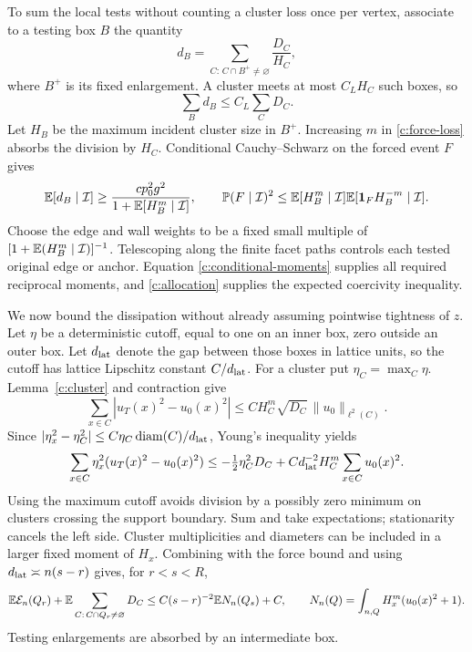 To sum the local tests without counting a cluster loss once per vertex,
associate to a testing box $B$ the quantity
\[
 d_B=\sum_{C:\,C\cap B^+\ne\varnothing}\frac{D_C}{H_C},
\]
where $B^+$ is its fixed enlargement. A cluster meets at most $C_LH_C$
such boxes, so
\begin{equation}\label{c:allocation}
 \sum_Bd_B\le C_L\sum_CD_C.
\end{equation}
Let $H_B$ be the maximum incident cluster size in $B^+$. Increasing $m$
in \eqref{c:force-loss} absorbs the division by $H_C$. Conditional
Cauchy--Schwarz on the forced event $F$ gives
\[
 \mathbb E[d_B\mid\mathcal I]
 \ge \frac{c p_0^2 g^2}{1+\mathbb E[H_B^m\mid\mathcal I]},
 \qquad
 \mathbb P(F\mid\mathcal I)^2
 \le \mathbb E[H_B^m\mid\mathcal I]
       \mathbb E[\mathbf1_F H_B^{-m}\mid\mathcal I].
\]
Choose the edge and wall weights to be a fixed small multiple of
$[1+\mathbb E(H_B^m\mid\mathcal I)]^{-1}$. Telescoping along the finite facet
paths controls each tested original edge or anchor. Equation
\eqref{c:conditional-moments} supplies all required reciprocal moments,
and \eqref{c:allocation} supplies the expected coercivity inequality.

We now bound the dissipation without already assuming pointwise tightness
of $z$. Let $\eta$ be a deterministic cutoff, equal to one on an inner
box, zero outside an outer box. Let $d_{\rm lat}$ denote the gap
between those boxes in lattice units, so the cutoff has lattice
Lipschitz constant $C/d_{\rm lat}$.
For a cluster put $\eta_C=\max_C\eta$. Lemma~\ref{c:cluster} and
contraction give
\[
 \sum_{x\in C}|u_T(x)^2-u_0(x)^2|
 \le C H_C^m\sqrt{D_C}\,\|u_0\|_{\ell^2(C)}.
\]
Since $|\eta_x^2-\eta_C^2|\le
C\eta_C\operatorname{diam}(C)/d_{\rm lat}$, Young's inequality yields
\begin{equation}\label{c:cutoff-cluster}
 \sum_{x\in C}\eta_x^2(u_T(x)^2-u_0(x)^2)
 \le-\tfrac12\eta_C^2D_C
      +C d_{\rm lat}^{-2}H_C^m\sum_{x\in C}u_0(x)^2.
\end{equation}
Using the maximum cutoff avoids division by a possibly zero minimum
on clusters crossing the support boundary. Sum and take expectations;
stationarity cancels the left side. Cluster multiplicities and
diameters can be included in a larger fixed moment of $H_x$. Combining
with the force bound and using $d_{\rm lat}\asymp n(s-r)$ gives,
for $r<s<R$,
\begin{equation}\label{c:caccioppoli}
 \mathbb E\mathcal E_n(Q_r)+
 \mathbb E\sum_{C:\,C\cap Q_r\ne\varnothing}D_C
 \le C(s-r)^{-2}\mathbb E N_n(Q_s)+C,
 \qquad
 N_n(Q)=\int_{n,Q}H_x^m(u_0(x)^2+1).
\end{equation}
Testing enlargements are absorbed by an intermediate box.

